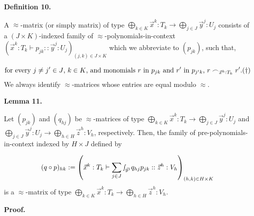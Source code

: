 \documentclass[10pt,a4paper]{amsart}
\begin{document}
 
 
 
\par\medskip\noindent\textbf{Definition 10.}\par
 
 
A $\approx$-matrix (or simply matrix) of type $\bigoplus_{k\in K}\vec{x}^{k}:T_{k}\to\bigoplus_{j\in J}\vec{y}^{j}:U_{j}$ consists of a $(J\times K)$-indexed family of $\approx$-polynomials-in-context $\left(\vec{x}^{k}:T_{k}\vdash p_{jk}::\vec{y}^{j}:U_{j}\right)_{(j,k)\in J%
\times K}$ which we abbreviate to $(p_{jk})$, such that,\par
    \[\text{for every $j\neq j^{\prime}\in J$, $k\in K$, and monomials $r$ in $p_{jk%
}$ and $r^{\prime}$ in $p_{j^{\prime}k}$, $r\frown_{\vec{x}^{k}:T_{k}}r^{%
\prime}$.}\hfill({\dagger})\]    
We always identify $\approx$-matrices whose entries are equal modulo $\approx$.\par
 
 
 
 
\par\medskip\noindent\textbf{Lemma 11.}\par
 
 
Let $(p_{jk})$ and $(q_{hj})$ be $\approx$-matrices of type $\bigoplus_{k\in K}\vec{x}^{k}:T_{k}\to\bigoplus_{j\in J}\vec{y}^{j}:U_{j}$ and $\bigoplus_{j\in J}\vec{y}^{j}:U_{j}\to\bigoplus_{h\in H}\vec{z}^{h}:V_{h}$, respectively. Then, the family of pre-polynomials-in-context indexed by $H\times J$ defined by\par
    \[(q\circ p)_{hk}:=\left(\vec{x}^{k}:T_{k}\vdash\sum_{j\in J}{\smallint\!}_{\vec%
{y}^{j}}q_{hj}p_{jk}::\vec{z}^{h}:V_{h}\right)_{(h,k)\in H\times K}\]    
is a $\approx$-matrix of type $\bigoplus_{k\in K}\vec{x}^{k}:T_{k}\to\bigoplus_{h\in H}\vec{z}^{h}:V_{h}$.\par
 
 
 
 
 
\par\medskip\noindent\textbf{Proof.}\par
 
\end{document}
